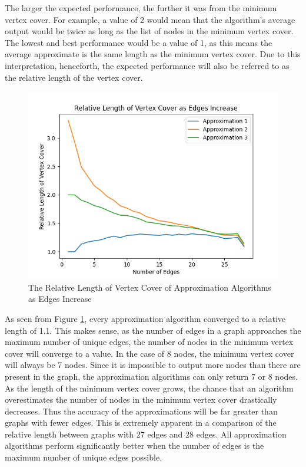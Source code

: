 \documentclass[titlepage]{article}
\begin{document}
The larger the expected performance, the further it was from the minimum vertex cover. For example, a value of 2 would mean that the algorithm's average output would be twice as long as the list of nodes in the minimum vertex cover. The lowest and best performance would be a value of 1, as this means the average approximate is the same length as the minimum vertex cover. Due to this interpretation, henceforth, the expected performance will also be referred to as the relative length of the vertex cover.


\begin{figure}[H]
    \centering
    \includegraphics[width=0.8\linewidth]{experiment_3_1.png}
    \caption{The Relative Length of Vertex Cover of Approximation Algorithms as Edges Increase}
    \label{fig:experiment_3_1}
\end{figure}

As seen from Figure \ref{fig:experiment_3_1}, every approximation algorithm converged to a relative length of 1.1. This makes sense, as the number of edges in a graph approaches the maximum number of unique edges, the number of nodes in the minimum vertex cover will converge to a value. In the case of 8 nodes, the minimum vertex cover will always be 7 nodes. Since it is impossible to output more nodes than there are present in the graph, the approximation algorithms can only return 7 or 8 nodes. As the length of the minimum vertex cover grows, the chance that an algorithm overestimates the number of nodes in the minimum vertex cover drastically decreases. Thus the accuracy of the approximations will be far greater than graphs with fewer edges. This is extremely apparent in a comparison of the relative length between graphs with 27 edges and 28 edges. All approximation algorithms perform significantly better when the number of edges is the maximum number of unique edges possible.
\end{document}
